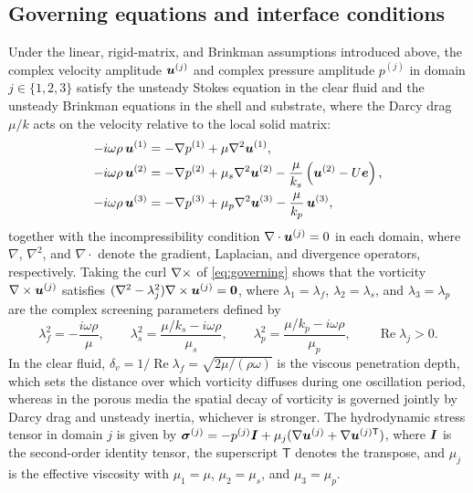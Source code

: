 \subsection{Governing equations and interface conditions}\label{sec:equations}
Under the linear, rigid-matrix, and Brinkman assumptions introduced above, the complex velocity amplitude $\bm{u}^{(j)}$
and complex pressure amplitude $p^{(j)}$ in domain $j\in\{1,2,3\}$ satisfy the unsteady Stokes equation in the clear
fluid and the unsteady Brinkman equations in the shell and substrate, where the Darcy drag $\mu/k$ acts on the velocity
relative to the local solid matrix:
\begin{subequations}\label{eq:governing}
\begin{align}
  -i\omega\rho\,\bm{u}^{(1)}&=-\nabla p^{(1)}+\mu\nabla^2\bm{u}^{(1)}, \label{eq:stokes}\\
  -i\omega\rho\,\bm{u}^{(2)}&=-\nabla p^{(2)}+\mu_s\nabla^2\bm{u}^{(2)}-\frac{\mu}{k_s}\left(\bm{u}^{(2)}-U\bm{e}\right),\\
  -i\omega\rho\,\bm{u}^{(3)}&=-\nabla p^{(3)}+\mu_p\nabla^2\bm{u}^{(3)}-\frac{\mu}{k_p}\,\bm{u}^{(3)},
\end{align}
\end{subequations}
together with the incompressibility condition $\nabla\cdot\bm{u}^{(j)}=0$ in each domain, where $\nabla$, $\nabla^2$, and
$\nabla\cdot$ denote the gradient, Laplacian, and divergence operators, respectively. Taking the curl $\nabla\times$ of
\cref{eq:governing} shows that the vorticity $\nabla\times\bm{u}^{(j)}$ satisfies $(\nabla^2-\lambda_j^2)\nabla\times\bm{u}^{(j)}=\bm 0$,
where $\lambda_1=\lambda_f$, $\lambda_2=\lambda_s$, and $\lambda_3=\lambda_p$ are the complex screening parameters
defined by
\begin{equation}
  \lambda_f^2=-\frac{i\omega\rho}{\mu},\qquad
  \lambda_s^2=\frac{\mu/k_s-i\omega\rho}{\mu_s},\qquad
  \lambda_p^2=\frac{\mu/k_p-i\omega\rho}{\mu_p},\qquad\operatorname{Re}\lambda_j>0 .
  \label{eq:lambdas}
\end{equation}
In the clear fluid, $\delta_v=1/\operatorname{Re}\lambda_f=\sqrt{2\mu/(\rho\omega)}$ is the viscous penetration depth,
which sets the distance over which vorticity diffuses during one oscillation period, whereas in the porous media the
spatial decay of vorticity is governed jointly by Darcy drag and unsteady inertia, whichever is stronger. The hydrodynamic stress tensor in
domain $j$ is given by $\bm{\sigma}^{(j)}=-p^{(j)}\bm{I}+\mu_j(\nabla\bm{u}^{(j)}+\nabla\bm{u}^{(j)\mathsf T})$, where $\bm{I}$ is the
second-order identity tensor, the superscript $\mathsf T$ denotes the transpose, and $\mu_j$ is the effective viscosity
with $\mu_1=\mu$, $\mu_2=\mu_s$, and $\mu_3=\mu_p$.

